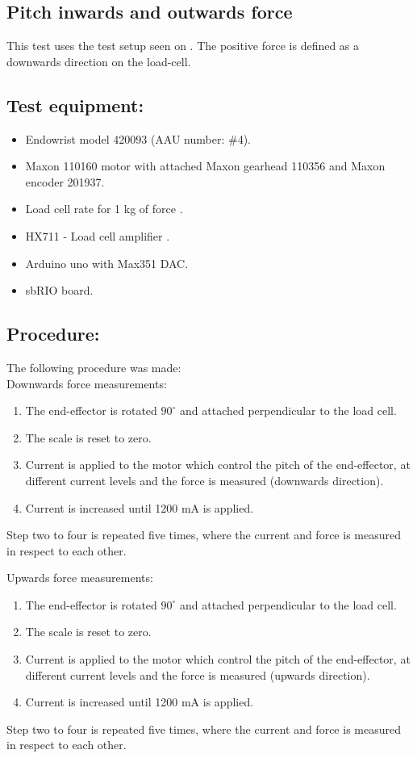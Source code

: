 \subsection{Pitch inwards and outwards force} %
This test uses the test setup seen on . The positive force is defined as a downwards direction on the load-cell.


\subsection*{Test equipment:}
\begin{itemize}
\item Endowrist model 420093 (AAU number: \#4).
\item Maxon 110160 motor with attached Maxon gearhead 110356 and Maxon encoder 201937.
\item Load cell rate for 1 kg of force \cite{Load_cell_1kg}.
\item HX711 - Load cell amplifier \cite{HX711}.
\item Arduino uno with Max351 DAC.
\item sbRIO board.
\end{itemize}

\subsection*{Procedure:}
The following procedure was made:\\
Downwards force measurements:
\begin{enumerate}
\item The end-effector is rotated $90^\circ$ and attached perpendicular to the load cell. 
\item The scale is reset to zero.
\item Current is applied to the motor which control the pitch of the end-effector, at different current levels and the force is measured (downwards direction).
\item Current is increased until 1200 mA is applied.
\end{enumerate}
Step two to four is repeated five times, where the current and force is measured in respect to each other. 

Upwards force measurements:
\begin{enumerate}
\item The end-effector is rotated $90^\circ$ and attached perpendicular to the load cell. 
\item The scale is reset to zero.
\item Current is applied to the motor which control the pitch of the end-effector, at different current levels and the force is measured (upwards direction).
\item Current is increased until 1200 mA is applied.
\end{enumerate}
Step two to four is repeated five times, where the current and force is measured in respect to each other. 


